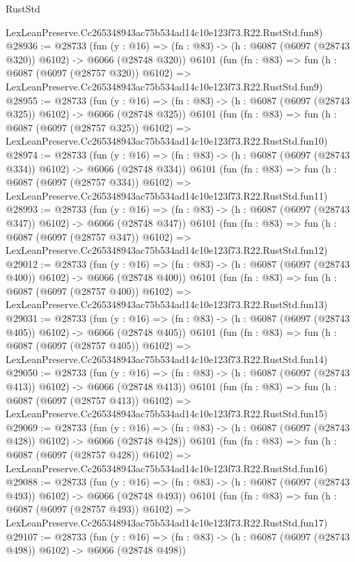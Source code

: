 \begin{lexlean}{RustStd}
\begin{coremodule}
    LexLeanPreserve.Cc265348943ac75b534ad14c10e123f73.R22.RustStd.fun8)
@28936 := @28733
    (fun (y : @16) => (fn : @83) -> (h : @6087 (@6097 (@28743 @320)) @6102) -> @6066 (@28748 @320))
    @6101
    (fun (fn : @83) =>
    fun (h : @6087 (@6097 (@28757 @320)) @6102) =>
    LexLeanPreserve.Cc265348943ac75b534ad14c10e123f73.R22.RustStd.fun9)
@28955 := @28733
    (fun (y : @16) => (fn : @83) -> (h : @6087 (@6097 (@28743 @325)) @6102) -> @6066 (@28748 @325))
    @6101
    (fun (fn : @83) =>
    fun (h : @6087 (@6097 (@28757 @325)) @6102) =>
    LexLeanPreserve.Cc265348943ac75b534ad14c10e123f73.R22.RustStd.fun10)
@28974 := @28733
    (fun (y : @16) => (fn : @83) -> (h : @6087 (@6097 (@28743 @334)) @6102) -> @6066 (@28748 @334))
    @6101
    (fun (fn : @83) =>
    fun (h : @6087 (@6097 (@28757 @334)) @6102) =>
    LexLeanPreserve.Cc265348943ac75b534ad14c10e123f73.R22.RustStd.fun11)
@28993 := @28733
    (fun (y : @16) => (fn : @83) -> (h : @6087 (@6097 (@28743 @347)) @6102) -> @6066 (@28748 @347))
    @6101
    (fun (fn : @83) =>
    fun (h : @6087 (@6097 (@28757 @347)) @6102) =>
    LexLeanPreserve.Cc265348943ac75b534ad14c10e123f73.R22.RustStd.fun12)
@29012 := @28733
    (fun (y : @16) => (fn : @83) -> (h : @6087 (@6097 (@28743 @400)) @6102) -> @6066 (@28748 @400))
    @6101
    (fun (fn : @83) =>
    fun (h : @6087 (@6097 (@28757 @400)) @6102) =>
    LexLeanPreserve.Cc265348943ac75b534ad14c10e123f73.R22.RustStd.fun13)
@29031 := @28733
    (fun (y : @16) => (fn : @83) -> (h : @6087 (@6097 (@28743 @405)) @6102) -> @6066 (@28748 @405))
    @6101
    (fun (fn : @83) =>
    fun (h : @6087 (@6097 (@28757 @405)) @6102) =>
    LexLeanPreserve.Cc265348943ac75b534ad14c10e123f73.R22.RustStd.fun14)
@29050 := @28733
    (fun (y : @16) => (fn : @83) -> (h : @6087 (@6097 (@28743 @413)) @6102) -> @6066 (@28748 @413))
    @6101
    (fun (fn : @83) =>
    fun (h : @6087 (@6097 (@28757 @413)) @6102) =>
    LexLeanPreserve.Cc265348943ac75b534ad14c10e123f73.R22.RustStd.fun15)
@29069 := @28733
    (fun (y : @16) => (fn : @83) -> (h : @6087 (@6097 (@28743 @428)) @6102) -> @6066 (@28748 @428))
    @6101
    (fun (fn : @83) =>
    fun (h : @6087 (@6097 (@28757 @428)) @6102) =>
    LexLeanPreserve.Cc265348943ac75b534ad14c10e123f73.R22.RustStd.fun16)
@29088 := @28733
    (fun (y : @16) => (fn : @83) -> (h : @6087 (@6097 (@28743 @493)) @6102) -> @6066 (@28748 @493))
    @6101
    (fun (fn : @83) =>
    fun (h : @6087 (@6097 (@28757 @493)) @6102) =>
    LexLeanPreserve.Cc265348943ac75b534ad14c10e123f73.R22.RustStd.fun17)
@29107 := @28733
    (fun (y : @16) => (fn : @83) -> (h : @6087 (@6097 (@28743 @498)) @6102) -> @6066 (@28748 @498))

\end{coremodule}
\end{lexlean}
